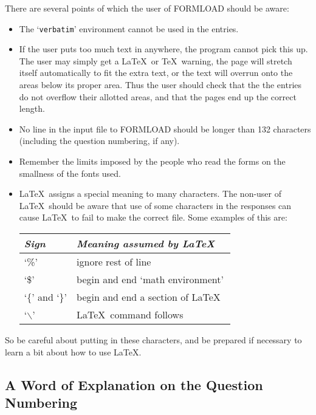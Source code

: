 There are several points of which the user of FORMLOAD should be aware:

\begin{itemize}

\item The `{\tt verbatim}' environment cannot be used in the entries.

\item If the user puts too much text in anywhere, the program cannot pick
this up. The user may simply get a \LaTeX\ or \TeX\ warning, the page will
stretch itself automatically to fit the extra text, or the text will
overrun onto the areas below its proper area. Thus the user
should check that the the entries do not overflow their allotted areas, and
that the pages end up the correct length. 

\item No line in the input file to FORMLOAD should be longer than 132
characters (including the question numbering, if any). 

\item Remember the limits imposed by the people who read the forms on the
smallness of the fonts used. 

\item \LaTeX\ assigns a special meaning to many characters. The non-user of
\LaTeX\  should be aware that use of some characters in the responses can
cause \LaTeX\ to fail to make the correct file. Some examples of this are: 

\begin{center}
\begin{tabular}{|l|l|} \hline
  {\it Sign}     &  {\it Meaning assumed by \LaTeX\ } \\ \hline \hline
 `\%'            &  ignore rest of line \\ \hline
 `\$'            &  begin and end `math environment' \\ \hline
 `\{' and `\}'   &  begin and end a section of \LaTeX\ \\ \hline
 `$\backslash$'  &  \LaTeX\ command follows \\ \hline
\end{tabular}
\end{center}
\end{itemize}

So be careful about putting in these characters, and be prepared if
necessary to learn a bit about how to use \LaTeX . 

\subsection{A Word of Explanation on the Question Numbering}

